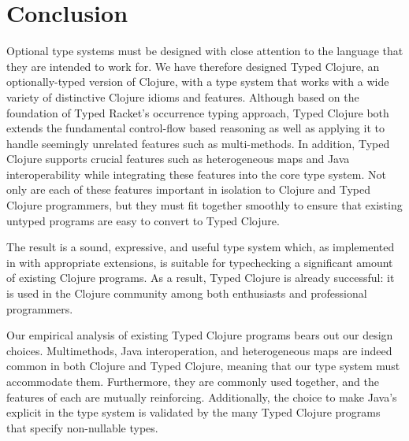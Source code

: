 \section{Conclusion}
\label{sec:conclusion}

Optional type systems must be designed with close attention to the
language that they are intended to work for.
We have therefore designed Typed Clojure, an optionally-typed version of
Clojure, with a type system that works with a wide variety of distinctive
Clojure idioms and features. Although based on the foundation of Typed
Racket's occurrence typing approach, Typed Clojure both extends the
fundamental control-flow based reasoning as well as applying it to
handle seemingly unrelated features such as multi-methods. In
addition, Typed Clojure supports crucial features such as
heterogeneous maps and Java interoperability while integrating these
features into the core type system. Not only are each of these
features important in isolation to Clojure and Typed Clojure
programmers, but they must fit together smoothly to ensure that
existing untyped programs are easy to convert to Typed Clojure.

The result is a sound, expressive, and useful type system which, as
implemented in \coretyped with appropriate extensions, is suitable for
typechecking a significant amount of existing Clojure programs.
%
As a result, Typed Clojure is already successful: it is used in
the Clojure community among both enthusiasts and professional
programmers.%

Our empirical analysis of existing Typed Clojure programs bears out
our design choices. Multimethods, Java interoperation, and
heterogeneous maps are indeed common in both Clojure and Typed Clojure,
meaning that our type system must accommodate them. Furthermore, they
are commonly used together, and the features of each are mutually
reinforcing. Additionally, the choice to make Java's 
explicit in the type system is validated by the many Typed Clojure
programs that  specify non-nullable types.


%

